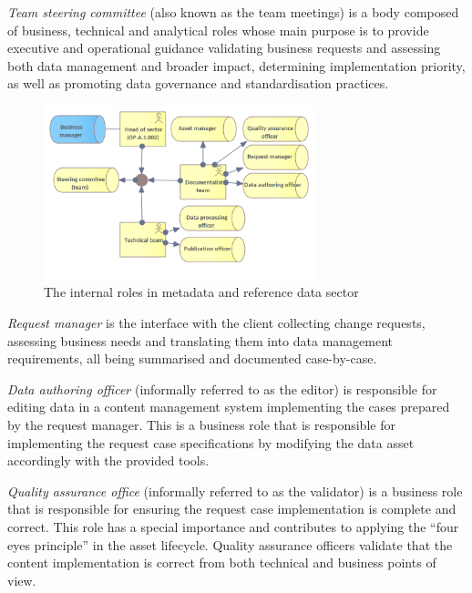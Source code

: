 	\textit{Team steering committee} (also known as the team meetings) is a body composed of business, technical and analytical roles whose main purpose is to provide executive and operational guidance validating business requests and assessing both data management and broader impact, determining implementation priority, as well as promoting data governance and standardisation practices.
	
	
	\begin{figure}[h]
		\centering
		\includegraphics[width=0.7\textwidth]{images/business/Internal Roles.png}
		\caption{The internal roles in metadata and reference data sector}
		\label{fig:internal-roles}
	\end{figure}
	
	\textit{Request manager} is the interface with the client collecting change requests, assessing business needs and translating them into data management requirements, all being summarised and documented case-by-case. 
	
	\textit{Data authoring officer} (informally referred to as the editor) is responsible for editing data in a content management system implementing the cases prepared by the request manager. This is a business role that is responsible for implementing the request case specifications by modifying the data asset accordingly with the provided tools.
	
	\textit{Quality assurance office}  (informally referred to as the validator) is a business role that is responsible for ensuring the request case implementation is complete and correct. This role has a special importance and contributes to applying the ``four eyes principle'' in the asset lifecycle. Quality assurance officers validate that the content implementation is correct from both technical and business points of view. 
	
